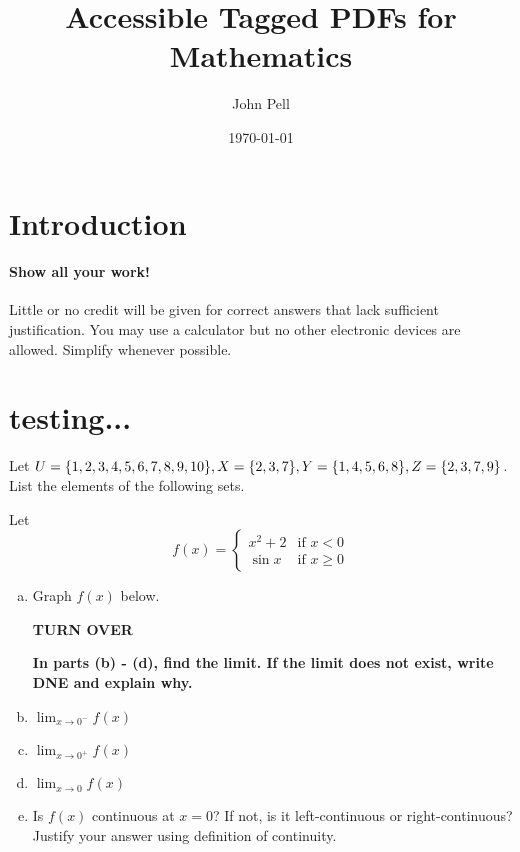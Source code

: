 \documentclass[12pt]{gWmaths}
\author{John Pell}
\title{Accessible Tagged PDFs for Mathematics}
\date{\today}
\begin{document}
\maketitle

\section{Introduction}
\paragraph{Show all your work!} Little or no credit will be given for correct answers that lack sufficient justification. You may use a calculator but no other electronic devices are allowed. Simplify whenever possible.

\section{testing...}

\begin{theorem}[10 pts]
Let $U = \{1,2,3,4,5,6,7,8,9,10 \}, X = \{2,3,7 \},Y = \{1,4,5,6,8 \}, \\
Z = \{2,3,7,9 \}$. List the elements of the following sets. 
\end{theorem}

\Large


\begin{Exercise}
Let $$f(x) = \left\{
\begin{array}{ll} 
 x^2 + 2 & \text{if } x < 0 \\
\sin x & \text{if } x \geq 0
\end{array} \right. $$

\begin{enumerate}[a)]
\item Graph $f(x)$ below. \\


\centerline{\bf TURN OVER}
\vfill\eject

\noindent
\textbf{In parts (b) - (d), find the limit. If the limit does not exist, write DNE and explain why.} \\

\item  $\lim_{x \to 0^-} f(x)$
\vspace{0.3 in}
\item  $\lim_{x \to 0^+} f(x)$
\vspace{0.3 in}
\item  $\lim_{x \to 0} f(x)$
\vspace{0.5 in}
\item Is $f(x)$ continuous at $x = 0$? If not, is it left-continuous or right-continuous? Justify your answer using definition of continuity. 
\vspace{2 in}
\end{enumerate}
\end{Exercise}
\end{document}
